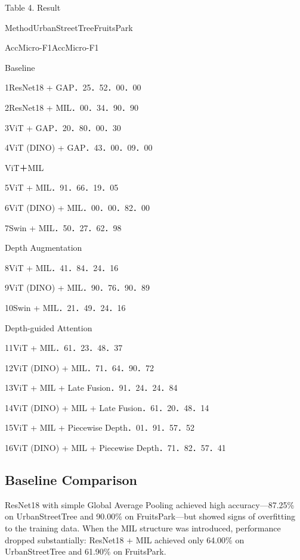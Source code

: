 Table 4. Result

Method\quad UrbanStreetTree\quad FruitsPark

Acc\quad Micro-F1\quad Acc\quad Micro-F1

Baseline

1\quad ResNet18 + GAP．25．52．00．00

2\quad ResNet18 + MIL．00．34．90．90

3\quad ViT + GAP．20．80．00．30

4\quad ViT (DINO) + GAP．43．00．09．00

ViT＋MIL

5\quad ViT + MIL．91．66．19．05

6\quad ViT (DINO) + MIL．00．00．82．00

7\quad Swin + MIL．50．27．62．98

Depth Augmentation

8\quad ViT + MIL．41．84．24．16

9\quad ViT (DINO) + MIL．90．76．90．89

10\quad Swin + MIL．21．49．24．16

Depth-guided Attention

11\quad ViT + MIL．61．23．48．37

12\quad ViT (DINO) + MIL．71．64．90．72

13\quad ViT + MIL + Late Fusion．91．24．24．84

14\quad ViT (DINO) + MIL + Late Fusion．61．20．48．14

15\quad ViT + MIL + Piecewise Depth．01．91．57．52

16\quad ViT (DINO) + MIL + Piecewise Depth．71．82．57．41

\subsection{Baseline Comparison}
ResNet18 with simple Global Average Pooling achieved high accuracy—87.25\% on UrbanStreetTree and 90.00\% on FruitsPark—but showed signs of overfitting to the training data. When the MIL structure was introduced, performance dropped substantially: ResNet18 + MIL achieved only 64.00\% on UrbanStreetTree and 61.90\% on FruitsPark.


